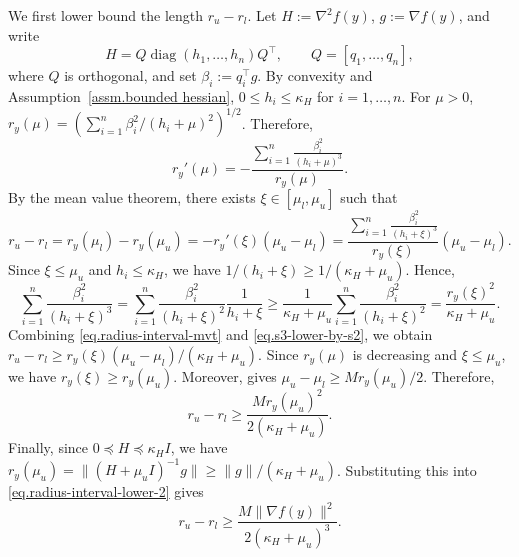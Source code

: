 \documentclass[moor,sglanonrev]{informs4}
\begin{document}
\begin{APPENDICES}
{        We first lower bound the length \(r_u-r_l\). Let \(H:=\nabla^2 f(y)\),
        \(g:=\nabla f(y)\), and write
        \[
            H=Q\operatorname{diag}(h_1,\ldots,h_n)Q^\top,
            \qquad
            Q=[q_1,\ldots,q_n],
        \]
        where $Q$ is orthogonal, and set \(\beta_i:=q_i^\top g\). By convexity and
        Assumption~\ref{assm.bounded hessian}, \(0\le h_i\le \kappa_H\) for
        \(i=1,\ldots,n\). For \(\mu>0\),
        \(r_y(\mu)=\left(\sum_{i=1}^n\beta_i^2/(h_i+\mu)^2\right)^{1/2}\).
        Therefore,
        \begin{equation}
            \label{eq.derivative-ry}
            r_y'(\mu)
            =
            -
            \frac{
                \sum_{i=1}^n
                \frac{\beta_i^2}{(h_i+\mu)^3}
            }{
                r_y(\mu)
            }.
        \end{equation}
        By the mean value theorem, there exists
        \(\xi\in[\mu_l,\mu_u]\) such that
        \begin{equation}
            r_u-r_l
            =
            r_y(\mu_l)-r_y(\mu_u)
            =
            -r_y'(\xi)(\mu_u-\mu_l)
            =
            \frac{
                \sum_{i=1}^n
                \frac{\beta_i^2}{(h_i+\xi)^3}
            }{
                r_y(\xi)
            }
            (\mu_u-\mu_l).
            \label{eq.radius-interval-mvt}
        \end{equation}
        Since \(\xi\le \mu_u\) and \(h_i\le \kappa_H\), we have
        \(1/(h_i+\xi)\ge 1/(\kappa_H+\mu_u)\). Hence,
        \begin{equation}
            \sum_{i=1}^n
            \frac{\beta_i^2}{(h_i+\xi)^3}
            =
            \sum_{i=1}^n
            \frac{\beta_i^2}{(h_i+\xi)^2}
            \frac{1}{h_i+\xi}
            \ge
            \frac{1}{\kappa_H+\mu_u}
            \sum_{i=1}^n
            \frac{\beta_i^2}{(h_i+\xi)^2}
            =
            \frac{r_y(\xi)^2}{\kappa_H+\mu_u}.
            \label{eq.s3-lower-by-s2}
        \end{equation}
        Combining \eqref{eq.radius-interval-mvt} and \eqref{eq.s3-lower-by-s2}, we obtain
        \(r_u-r_l\ge r_y(\xi)(\mu_u-\mu_l)/(\kappa_H+\mu_u)\).
        Since \(r_y(\mu)\) is decreasing and \(\xi\le \mu_u\), we have
        \(r_y(\xi)\ge r_y(\mu_u)\). Moreover,  gives
        \(\mu_u-\mu_l\ge M r_y(\mu_u)/2\). Therefore,
        \begin{equation}
            \label{eq.radius-interval-lower-2}
            r_u-r_l
            \ge
            \frac{M r_y(\mu_u)^2}{2(\kappa_H+\mu_u)}.
        \end{equation}
        Finally, since \(0\preceq H\preceq \kappa_H I\), we have
        \(r_y(\mu_u)=\|(H+\mu_u I)^{-1}g\|\ge \|g\|/(\kappa_H+\mu_u)\).
        Substituting this into \eqref{eq.radius-interval-lower-2} gives
        \begin{equation}
            \label{eq.radius-interval-lower-final}
            r_u-r_l
            \ge
            \frac{M\|\nabla f(y)\|^2}{2(\kappa_H+\mu_u)^3}.
        \end{equation}

}
\end{APPENDICES}
\end{document}
